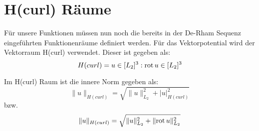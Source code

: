 \newpage
\section{H(curl) R\"aume}
F\"ur unsere Funktionen m\"ussen nun noch die bereits in der De-Rham Sequenz eingef\"uhrten Funktionenr\"aume definiert werden. F\"ur das Vektorpotential wird der Vektorraum H(curl) verwendet. Dieser ist gegeben als:
\begin{equation}
	H(curl) = u\in [L_2]^3:\mathrm{rot}\, u\in [L_2]^3
	\label{eq:hcurl}
\end{equation}
\par
Im H(curl) Raum ist die innere Norm gegeben als:
\begin{equation}
	\|u\|_{H(curl)} = \sqrt{\|u\|^2_{L_2} + |u|^2_{H(curl)}}
\end{equation}
bzw.
\begin{equation}
	\|u\|_{H(curl)} = \sqrt{\|u\|^2_{L_2} + \|\mathrm{rot}\, u\|^2_{L_2}}
\end{equation}
